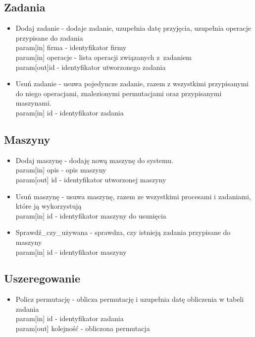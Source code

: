 \documentclass[a4paper]{article}
\begin{document}
\subsection{Zadania}
\begin{itemize}
    \item Dodaj zadanie - dodaje zadanie, uzupełnia datę przyjęcia, uzupełnia operacje przypisane do zadania \\
        param[in] firma - identyfikator firmy                       \\
        param[in] operacje - lista operacji związanych z~zadaniem   \\
        param[out]id - identyfikator utworzonego zadania            \\
    \item Usuń zadanie - usuwa pojedyncze zadanie, razem z wszystkimi przypisanymi do niego operacjami, znalezionymi permutacjami oraz przypisanymi maszynami.             \\
        param[in] id - identyfikator zadania
\end{itemize}

\subsection{Maszyny}
\begin{itemize}
    \item Dodaj maszynę - dodaję nową maszynę do systemu.   \\
        param[in] opis - opis maszyny                       \\
        param[out] id - identyfikator utworzonej maszyny    \\
    \item Usuń maszynę - usuwa maszynę, razem ze wszystkimi procesami i zadaniami, które ją wykorzystują \\
        param[in] id - identyfikator maszyny do usunięcia   \\
    \item Sprawdź\_czy\_używana - sprawdza, czy istnieją zadania przypisane do maszyny \\
        param[in] id - identyfikator maszyny                \\
\end{itemize}

\subsection{Uszeregowanie}
\begin{itemize}
    \item Policz permutację - oblicza permutację i uzupełnia datę obliczenia w tabeli zadania \\
        param[in] id - identyfikator zadania \\
        param[out] kolejność - obliczona permutacja
\end{itemize}
\end{document}
